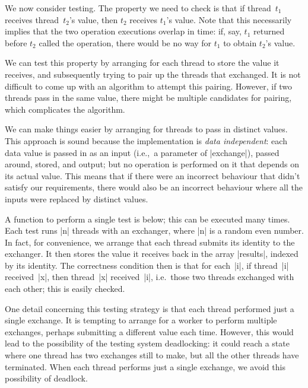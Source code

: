 
We now consider testing.  The property we need to check is that if
thread~$t_1$ receives thread~$t_2$'s value, then $t_2$ receives $t_1$'s value.
Note that this necessarily implies that the two operation executions overlap
in time: if, say, $t_1$ returned before $t_2$ called the operation, there
would be no way for $t_1$ to obtain $t_2$'s value.  

We can test this property by arranging for each thread to store the value it
receives, and subsequently trying to pair up the threads that exchanged.  It
is not difficult to come up with an algorithm to attempt this pairing.
However, if two threads pass in the same value, there might be multiple
candidates for pairing, which complicates the algorithm.

We can make things easier by arranging for threads to pass in distinct values.
This approach is sound because the implementation is \emph{data independent}:
each data value is passed in as an input (i.e.,~a parameter of |exchange|),
passed around, stored, and output; but no operation is performed on it that
depends on its actual value.  This means that if there were an incorrect
behaviour that didn't satisfy our requirements, there would also be an
incorrect behaviour where all the inputs were replaced by distinct values.

A function to perform a single test is below; this can be executed many times.
Each test runs |n| threads with an exchanger, where |n| is a random even
number.  In fact, for convenience, we arrange that each thread submits its
identity to the exchanger.  It then stores the value it receives back in the
array |results|, indexed by its identity.  The correctness condition then is
that for each~|i|, if thread~|i| received~|x|, then thread~|x| received~|i|,
i.e.~those two threads exchanged with each other; this is easily checked.
%
%

One detail concerning this testing strategy is that each thread performed just
a single exchange.  It is tempting to arrange for a worker to perform multiple
exchanges, perhaps submitting a different value each time.  However, this would
lead to the possibility of the testing system deadlocking: it could reach a
state where one thread has two exchanges still to make, but all the other
threads have terminated.  When each thread performs just a single exchange, we
avoid this possibility of deadlock. 

